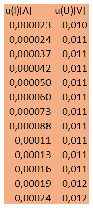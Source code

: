 \documentclass{article}
\begin{document}
\begin{figure}[b!]
  \centering
  \begin{subfigure}[b]{0.15\textwidth}
    \includegraphics[width=\linewidth]{Niepewnosci_Dioda_Czerwona.png}

\end{subfigure}
\end{figure}
\end{document}
